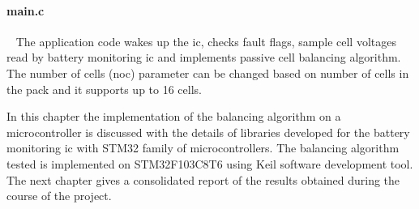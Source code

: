 

\paragraph{main.c} ~\linebreak
The application code wakes up the \acrshort{ic}, checks fault flags, sample cell voltages read by battery monitoring \acrshort{ic}  and implements passive cell balancing algorithm. The number of cells (\acrshort{noc}) parameter can be changed based on number of cells in the pack and it supports up to 16 cells.



\vspace{2cm}

In this chapter the implementation of the balancing algorithm on a  microcontroller is discussed with the details of libraries developed for the battery monitoring \acrshort{ic} with STM32 family of microcontrollers. The balancing algorithm tested is implemented on STM32F103C8T6 using Keil software development tool. The next chapter gives a consolidated report of the results obtained during the course of the project.

